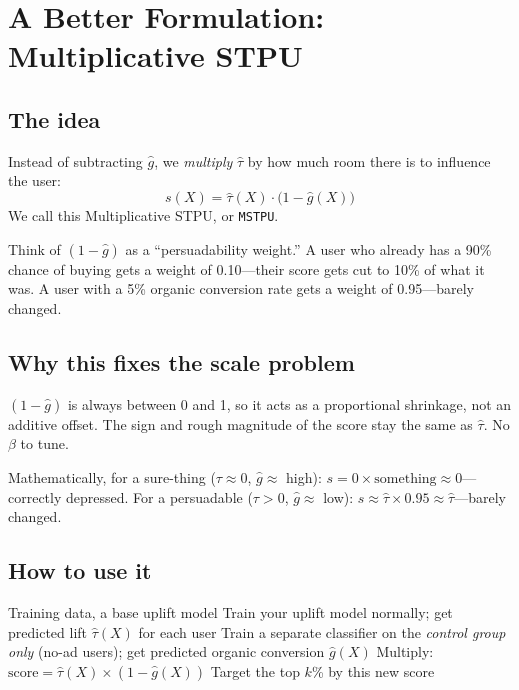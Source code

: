 \documentclass[10pt]{article}
\newcommand{\mstpu}{\texttt{MSTPU}\xspace}
\newcommand{\ghat}{\hat{g}(X)}
\newcommand{\tauhat}{\hat{\tau}(X)}
\begin{document}
\section{A Better Formulation: Multiplicative STPU}
\label{sec:mstpu}

\subsection{The idea}

Instead of subtracting $\hat{g}$, we \emph{multiply} $\hat{\tau}$ by
how much room there is to influence the user:
\begin{equation}
  s(X) = \tauhat \cdot \bigl(1 - \ghat\bigr)
  \label{eq:multiplicative}
\end{equation}
We call this Multiplicative STPU, or \mstpu.

Think of $(1 - \hat{g})$ as a ``persuadability weight.''  A user who
already has a 90\% chance of buying gets a weight of 0.10---their score
gets cut to 10\% of what it was.  A user with a 5\% organic conversion
rate gets a weight of 0.95---barely changed.

\subsection{Why this fixes the scale problem}

$(1-\hat{g})$ is always between 0 and 1, so it acts as a proportional
shrinkage, not an additive offset.  The sign and rough magnitude of the
score stay the same as $\hat{\tau}$.  No $\beta$ to tune.

Mathematically, for a sure-thing ($\tau \approx 0$, $\hat{g} \approx$ high):
$s = 0 \times \text{something} \approx 0$---correctly depressed.
For a persuadable ($\tau > 0$, $\hat{g} \approx$ low):
$s \approx \hat{\tau} \times 0.95 \approx \hat{\tau}$---barely changed.

\subsection{How to use it}

\begin{algorithm}[H]
\caption{Multiplicative STPU in practice}
\begin{algorithmic}[1]
  \Require Training data, a base uplift model
  \State Train your uplift model normally; get predicted lift $\hat{\tau}(X)$ for each user
  \State Train a separate classifier on the \emph{control group only} (no-ad users);
         get predicted organic conversion $\hat{g}(X)$
  \State Multiply: $\text{score} = \hat{\tau}(X) \times (1 - \hat{g}(X))$
  \State Target the top $k$\% by this new score
\end{algorithmic}
\end{algorithm}
\end{document}
